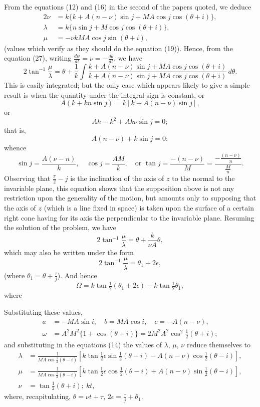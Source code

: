 \documentclass[11pt,a4paper]{article}
\theoremstyle{definition}
\begin{document}
From the equations (12) and (16) in the second of the papers quoted, we deduce
\begin{align*}
2\nu &= k\{k + A(n - \nu)\sin j + MA\cos j\cos(\theta + i)\}, \\
\lambda &= k\{n\sin j + M\cos j\cos(\theta + i)\}, \\
\mu &= -\nu kMA\cos j\sin(\theta + i),
\end{align*}
(values which verify as they should do the equation (19)). Hence, from the equation (27), writing $\frac{d\psi}{dt} = \nu = -\frac{d\theta}{dt}$, we have
\[
2\tan^{-1}\frac{\mu}{\lambda} = \theta + \frac{1}{k}\int \frac{k + A(n - \nu)\sin j + MA\cos j\cos(\theta + i)}{k + A(n - \nu)\sin j + MA\cos j\cos(\theta + i)}\, d\theta.
\]
This is easily integrated; but the only case which appears likely to give a simple result is when the quantity under the integral sign is constant, or
\[
A(k + kn\sin j) = k[k + A(n - \nu)\sin j],
\]
or
\[
Ah - k^{2} + Ak\nu\sin j = 0;
\]
that is,
\[
A(n - \nu) + k\sin j = 0:
\]
whence
\[
\sin j = \frac{A(\nu - n)}{k}, \quad \cos j = \frac{AM}{k}, \quad \text{or } \tan j = \frac{-(n - \nu)}{M} = \frac{-\frac{(n - \nu)}{n}}{\frac{M}{n}}.
\]
Observing that $\frac{\pi}{2} - j$ is the inclination of the axis of $z$ to the normal to the invariable plane, this equation shows that the supposition above is not any restriction upon the generality of the motion, but amounts only to supposing that the axis of $z$ (which is a line fixed in space) is taken upon the surface of a certain right cone having for its axis the perpendicular to the invariable plane. Resuming the solution of the problem, we have
\[
2\tan^{-1}\frac{\mu}{\lambda} = \theta + \frac{k}{\nu A}\theta,
\]
which may also be written under the form
\[
2\tan^{-1}\frac{\mu}{\lambda} = \theta_{1} + 2\epsilon,
\]
(where $\theta_{1} = \theta + \frac{\tau}{j}$). And hence
\[
\Omega = k\tan\tfrac{1}{2}(\theta_{1} + 2\epsilon) - k\tan\tfrac{1}{2}\theta_{1},
\]
where

\newpage

\setcounter{page}{464}

Substituting these values,
\begin{align*}
a &= -MA\sin i, \quad b = MA\cos i, \quad c = -A(n - \nu), \\
\omega &= A^{2}M^{2}\{1 + \cos(\theta + i)\} = 2M^{2}A^{2}\cos^{2}\tfrac{1}{2}(\theta + i);
\end{align*}
and substituting in the equations (14) the values of $\lambda$, $\mu$, $\nu$ reduce themselves to
\begin{align*}
\lambda &= \frac{1}{MA\cos\tfrac{1}{2}(\theta - i)}[k\tan\tfrac{1}{2}\epsilon\sin\tfrac{1}{2}(\theta - i) - A(n - \nu)\cos\tfrac{1}{2}(\theta - i)], \\
\mu &= \frac{1}{MA\cos\tfrac{1}{2}(\theta - i)}[k\tan\tfrac{1}{2}\epsilon\cos\tfrac{1}{2}(\theta - i) + A(n - \nu)\sin\tfrac{1}{2}(\theta - i)], \\
\nu &= \tan\tfrac{1}{2}(\theta + i);\ kt,
\end{align*}
where, recapitulating, $\theta = \nu t + \tau$, $2\epsilon = \frac{\tau}{j} + \theta_{1}$.
\end{document}
